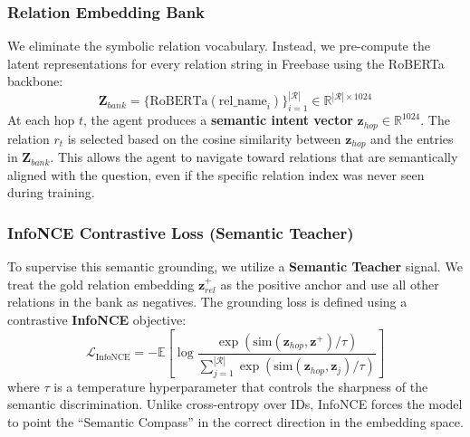 \documentclass[11pt,a4paper]{article}
\begin{document}
\subsubsection{Relation Embedding Bank}
We eliminate the symbolic relation vocabulary. Instead, we pre-compute the
latent representations for every relation string in Freebase using the
RoBERTa backbone:
\[
    \mathbf{Z}_{bank} = \{ \text{RoBERTa}(\text{rel\_name}_i) \}_{i=1}^{|\mathcal{R}|} \in \mathbb{R}^{|\mathcal{R}| \times 1024}
\]
At each hop $t$, the agent produces a \textbf{semantic intent vector}
$\mathbf{z}_{hop} \in \mathbb{R}^{1024}$. The relation $r_t$ is selected
based on the cosine similarity between $\mathbf{z}_{hop}$ and the entries in
$\mathbf{Z}_{bank}$. This allows the agent to navigate toward relations
that are semantically aligned with the question, even if the specific
relation index was never seen during training.

\subsubsection{InfoNCE Contrastive Loss (Semantic Teacher)}
To supervise this semantic grounding, we utilize a \textbf{Semantic Teacher}
signal. We treat the gold relation embedding $\mathbf{z}^+_{rel}$ as the
positive anchor and use all other relations in the bank as negatives.
The grounding loss is defined using a contrastive \textbf{InfoNCE} objective:
\begin{equation}
    \mathcal{L}_{\mathrm{InfoNCE}} = -\mathbb{E} \left[ \log \frac{\exp(\text{sim}(\mathbf{z}_{hop}, \mathbf{z}^+)/\tau)}{\sum_{j=1}^{|\mathcal{R}|} \exp(\text{sim}(\mathbf{z}_{hop}, \mathbf{z}_j)/\tau)} \right]
\end{equation}
where $\tau$ is a temperature hyperparameter that controls the sharpness of
the semantic discrimination. Unlike cross-entropy over IDs, InfoNCE forces
the model to point the ``Semantic Compass'' in the correct direction in the
embedding space.
\end{document}
